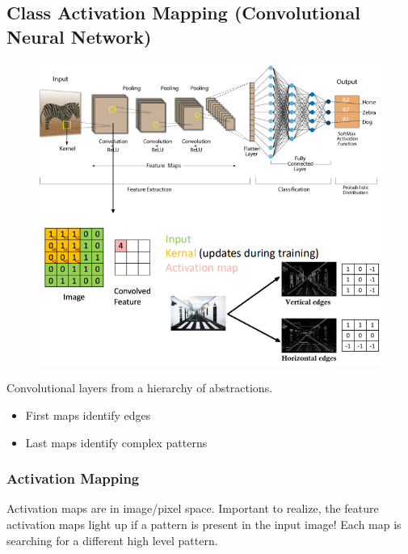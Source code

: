 \subsection{Class Activation Mapping (Convolutional Neural Network)}
\begin{figure}[!h]
    \includegraphics[width =  \columnwidth]{figures/XAI2/CAMCNN.png}
\end{figure}
Convolutional layers from a hierarchy of abstractions.
\begin{itemize}
    \item First maps identify edges
    \item Last maps identify complex patterns
\end{itemize}
\subsubsection{Activation Mapping}
Activation maps are in image/pixel space.
Important to realize, the feature activation maps light up if a pattern is present in the input image!
Each map is searching for a different high level pattern.


